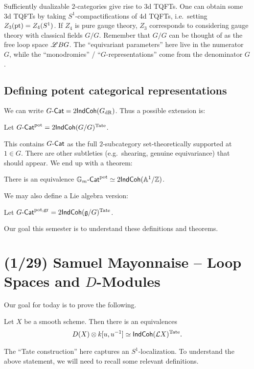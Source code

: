 \documentclass{article}
\begin{document}
Sufficiently dualizable $2$-categories give rise to 3d TQFTs.
One can obtain some 3d TQFTs by taking $S^1$-compactifications of 4d TQFTs, i.e.\ setting $Z_3(\operatorname{pt}) = Z_4(S^1)$.
If $Z_4$ is pure gauge theory, $Z_3$ corresponds to considering gauge theory with classical fields $G / G$.
Remember that $G / G$ can be thought of as the free loop space $\mathscr{L} BG$.
The ``equivariant parameters'' here live in the numerator $G$, while the ``monodromies'' / ``$G$-representations'' come from the denominator $G$.

\subsection{Defining potent categorical representations}

We can write $G\text{-}\mathsf{Cat} = 2\mathsf{IndCoh}(G_{\mathrm{dR}})$.
Thus a possible extension is:

\begin{dfn}
  Let $G\text{-}\mathsf{Cat}^{\mathrm{pot}} = 2\mathsf{IndCoh}(G / G)^{\mathrm{Tate}}$.
\end{dfn}

This contains $G\text{-}\mathsf{Cat}$ as the full $2$-subcategory set-theoretically supported at $1 \in G$.
There are other subtleties (e.g.\ shearing, genuine equivariance) that should appear. 
We end up with a theorem:

\begin{thm}
  There is an equivalence $\mathbb{G}_m\text{-}\mathsf{Cat}^{\mathrm{pot}} \simeq 2\mathsf{IndCoh}(\mathbb{A}^1 / \mathbb{Z})$.
\end{thm}

We may also define a Lie algebra version:

\begin{dfn}
  Let $G\text{-}\mathsf{Cat}^{\mathrm{pot},\operatorname{gr}} = 2\mathsf{IndCoh}(\mathfrak{g} / G)^{\mathrm{Tate}}$.
\end{dfn}

Our goal this semester is to understand these definitions and theorems.

\section{(1/29) Samuel Mayonnaise -- Loop Spaces and $D$-Modules}

Our goal for today is to prove the following.

\begin{thm}
  Let $X$ be a smooth scheme.
  Then there is an equivalences
  \[
    D(X) \otimes k[u, u^{-1}] \simeq \mathsf{IndCoh}(\mathcal{L} X)^{\mathrm{Tate}}.
  \]
\end{thm}

The ``Tate construction'' here captures an $S^1$-localization.
To understand the above statement, we will need to recall some relevant definitions.
\end{document}
